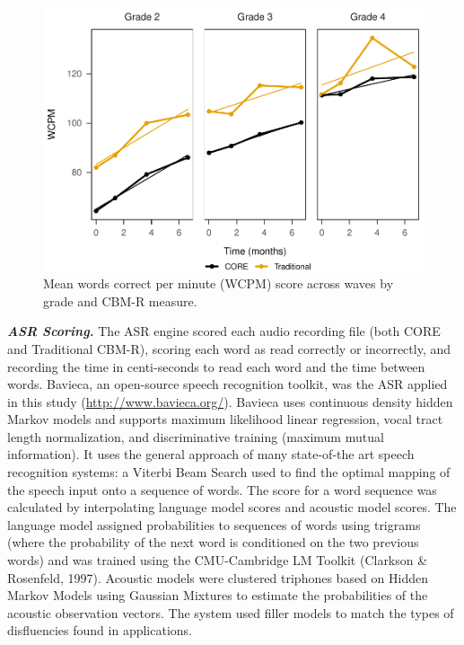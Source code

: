 \documentclass[
  english,
  man, fleqn, noextraspace]{apa6}
\begin{document}
\begin{center}
\begin{ThreePartTable}
\end{ThreePartTable}
\end{center}



\begin{figure}
\centering
\includegraphics{demo_files/figure-latex/fig-means-1.pdf}
\caption{\label{fig:fig-means}Mean words correct per minute (WCPM) score across waves by grade and CBM-R measure.}
\end{figure}

\textbf{\emph{ASR Scoring.}} The ASR engine scored each audio recording file (both CORE and Traditional CBM-R), scoring each word as read correctly or incorrectly, and recording the time in centi-seconds to read each word and the time between words. Bavieca, an open-source speech recognition toolkit, was the ASR applied in this study (\url{http://www.bavieca.org/}). Bavieca uses continuous density hidden Markov models and supports maximum likelihood linear regression, vocal tract length normalization, and discriminative training (maximum mutual information). It uses the general approach of many state-of-the art speech recognition systems: a Viterbi Beam Search used to find the optimal mapping of the speech input onto a sequence of words. The score for a word sequence was calculated by interpolating language model scores and acoustic model scores. The language model assigned probabilities to sequences of words using trigrams (where the probability of the next word is conditioned on the two previous words) and was trained using the CMU-Cambridge LM Toolkit (Clarkson \& Rosenfeld, 1997). Acoustic models were clustered triphones based on Hidden Markov Models using Gaussian Mixtures to estimate the probabilities of the acoustic observation vectors. The system used filler models to match the types of disfluencies found in applications.
\end{document}
